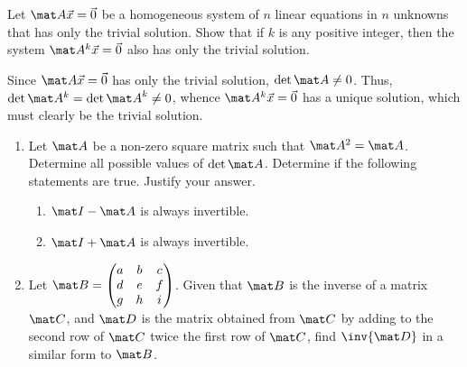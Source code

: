 \begin{problem}
    Let $\mat A \vec x = \vec 0$ be a homogeneous system of $n$ linear equations in $n$ unknowns that has only the trivial solution. Show that if $k$ is any positive integer, then the system $\mat A^k \vec x = \vec 0$ also has only the trivial solution.
\end{problem}
\begin{solution}
    Since $\mat A \vec x = \vec 0$ has only the trivial solution, $\det{\mat A} \neq 0$. Thus, $\det{\mat A^k} = \det{\mat A}^k \neq 0$, whence $\mat A^k \vec x = \vec 0$ has a unique solution, which must clearly be the trivial solution.
\end{solution}

\begin{problem}
    \begin{enumerate}
        \item Let $\mat A$ be a non-zero square matrix such that $\mat A^2 = \mat A$. Determine all possible values of $\det{\mat A}$. Determine if the following statements are true. Justify your answer.
        \begin{enumerate}
            \item $\mat I - \mat A$ is always invertible.
            \item $\mat I + \mat A$ is always invertible.
        \end{enumerate}
        \item Let $\mat B = \begin{pmatrix} a & b & c \\ d & e & f \\ g & h & i \end{pmatrix}$. Given that $\mat B$ is the inverse of a matrix $\mat C$, and $\mat D$ is the matrix obtained from $\mat C$ by adding to the second row of $\mat C$ twice the first row of $\mat C$, find $\inv{\mat D}$ in a similar form to $\mat B$.
    \end{enumerate}
\end{problem}
